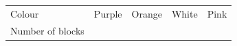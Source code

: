 \begin{enumerate}[noitemsep, label=\textbf{\arabic*}. ]
{    %
    
        \begin{center}
      
      \label{m39377*id114946}
      
    \noindent
      \tablelasttail{}
      \begin{xtabular*}{\mytablewidth}[t]{|p{10\mystarwidth}|p{10\mystarwidth}|p{10\mystarwidth}|p{10\mystarwidth}|p{10\mystarwidth}|}\hline
    
    
        Colour &
    
    
        Purple &
    
    
        Orange &
    
    
        White &
    
    
        Pink%
     \tabularnewline{}
    
    
        Number of
blocks &
    

\end{xtabular*}
\end{center}}
\end{enumerate}

